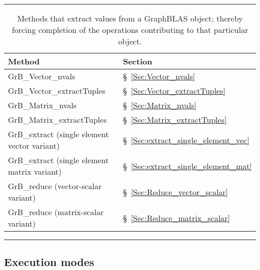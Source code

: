 \begin{table}[htb]
	\hrule
	\begin{center}
		\caption{Methods that extract values from a GraphBLAS object; thereby
		forcing completion of the operations contributing to that particular object.}
		\label{Tab:ExtractMethods}

		\begin{tabular}{l|l}
			Method	& Section \\ \hline

			{\sf GrB\_Vector\_nvals}		& \S~\ref{Sec:Vector_nvals}		\\
			{\sf GrB\_Vector\_extractTuples}	& \S~\ref{Sec:Vector_extractTuples}	\\
			{\sf GrB\_Matrix\_nvals}		& \S~\ref{Sec:Matrix_nvals}		\\
			{\sf GrB\_Matrix\_extractTuples}	& \S~\ref{Sec:Matrix_extractTuples}	\\
			{\sf GrB\_extract} (single element vector variant)	& \S~\ref{Sec:extract_single_element_vec}	\\
			{\sf GrB\_extract} (single element matrix variant)	& \S~\ref{Sec:extract_single_element_mat}	\\
			{\sf GrB\_reduce} (vector-scalar variant)		& \S~\ref{Sec:Reduce_vector_scalar}		\\
			{\sf GrB\_reduce} (matrix-scalar variant)		& \S~\ref{Sec:Reduce_matrix_scalar}		\\
		\end{tabular}
	\end{center}
	\hrule
\end{table}

\subsection{Execution modes}

